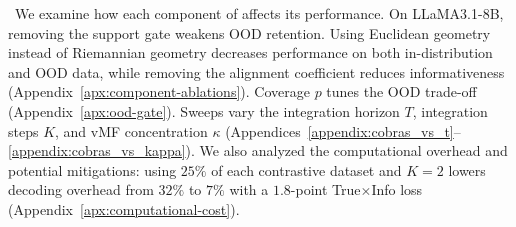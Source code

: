 


~We examine how each component of \Cobras affects its performance. On LLaMA3.1-8B, removing the support gate weakens OOD retention. Using Euclidean geometry instead of Riemannian geometry decreases performance on both in-distribution and OOD data, while removing the alignment coefficient reduces informativeness (Appendix~\ref{apx:component-ablations}). Coverage $p$ tunes the OOD trade-off (Appendix~\ref{apx:ood-gate}). Sweeps vary the integration horizon $T$, integration steps $K$, and vMF concentration $\kappa$ (Appendices~\ref{appendix:cobras_vs_t}--\ref{appendix:cobras_vs_kappa}). We also analyzed the computational overhead and potential mitigations: using $25\%$ of each contrastive dataset and $K=2$ lowers decoding overhead from $32\%$ to $7\%$ with a $1.8$-point True$\times$Info loss (Appendix~\ref{apx:computational-cost}).



